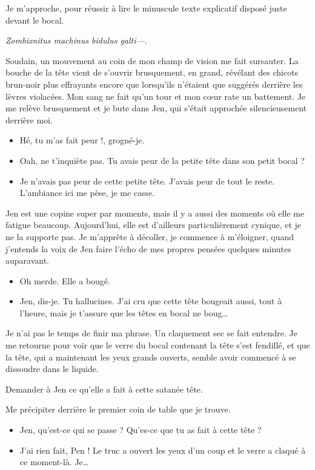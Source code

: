 Je m'approche, pour réussir à lire le minuscule texte explicatif disposé juste devant le bocal.

\textit{Zombixnitus machinus bidulus galti—}.

Soudain, un mouvement au coin de mon champ de vision me fait sursauter. La bouche de la tête vient de s'ouvrir brusquement, en grand, révélant des chicots brun-noir plus effrayants encore que lorsqu'ils n'étaient que suggérés derrière les lèvres violacées. Mon sang ne fait qu'un tour et mon cœur rate un battement. Je me relève brusquement et je bute dans Jen, qui s'était approchée silencieusement derrière moi.

\begin{itemize}
\item Hé, tu m'as fait peur !, grogné-je.
\item Oah, ne t'inquiète pas. Tu avais peur de la petite tête dans son petit bocal ?
\item Je n'avais pas peur de cette petite tête. J'avais peur de tout le reste. L'ambiance ici me pèse, je me casse.
\end{itemize}

Jen est une copine super par moments, mais il y a aussi des moments où elle me fatigue beaucoup. Aujourd'hui, elle est d'ailleurs particulièrement cynique, et je ne la supporte pas. Je m'apprête à décoller, je commence à m'éloigner, quand j'entends la voix de Jen faire l'écho de mes propres pensées quelques minutes auparavant.

\begin{itemize}
\item Oh merde. Elle a bougé.
\item Jen, dis-je. Tu hallucines. J'ai cru que cette tête bougeait aussi, tout à l'heure, mais je t'assure que les têtes en bocal ne boug…
\end{itemize}

Je n'ai pas le temps de finir ma phrase. Un claquement sec se fait entendre. Je me retourne pour voir que le verre du bocal contenant la tête s'est fendillé, et que la tête, qui a maintenant les yeux grands ouverts, semble avoir commencé à se dissoudre dans le liquide.

\item Demander à Jen ce qu'elle a fait à cette satanée tête. 
\item Me précipiter derrière le premier coin de table que je trouve. 
\enw
\begin{itemize}

\section{kestafoutu-jen}
\item Jen, qu'est-ce qui se passe ? Qu'es-ce que tu as fait à cette tête ?
\item J'ai rien fait, Pen ! Le truc a ouvert les yeux d'un coup et le verre a claqué à ce moment-là. Je…
\end{itemize}

